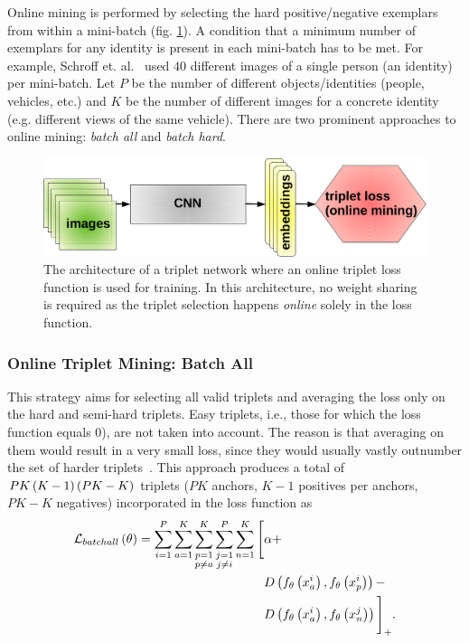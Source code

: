 Online mining is performed by selecting the hard positive/negative exemplars from within a mini-batch (fig. \ref{fig:TripletArchitectureOnlineMining}). A condition that a minimum number of exemplars for any identity is present in each mini-batch has to be met. For example, Schroff et. al.~\cite{schroff2015facenet} used $40$ different images of a single person (an identity) per mini-batch. Let $P$ be the number of different objects/identities (people, vehicles, etc.) and $K$ be the number of different images for a concrete identity (e.g. different views of the same vehicle). There are two prominent approaches to online mining: \emph{batch all} and \emph{batch hard}.

\begin{figure}[t]
    \centerline{\includegraphics[width=0.55\linewidth]{figures/theoretical_foundations/triplet_architecture_online_mining.pdf}}
    \caption[Triplet loss online mining architecture]{The architecture of a triplet network where an online triplet loss function is used for training. In this architecture, no weight sharing is required as the triplet selection happens \emph{online} solely in the loss function.}
    \label{fig:TripletArchitectureOnlineMining}
\end{figure}

\subsubsection{Online Triplet Mining: Batch All}

This strategy aims for selecting all valid triplets and averaging the loss only on the hard and semi-hard triplets. Easy triplets, i.e., those for which the loss function equals $0$), are not taken into account. The reason is that averaging on them would result in a very small loss, since they would usually vastly outnumber the set of harder triplets~\cite{hermans2017triplet}. This approach produces a total of $PK \left( {K - 1} \right) \left( {PK - K} \right)$ triplets ($PK$ anchors, $K - 1$ positives per anchors, $PK - K$ negatives) incorporated in the loss function as
\begin{equation}
    \label{eq:BatchAllLossFunction}
    \begin{aligned}
        {\mathcal{L}_{batchall}} \left( \theta \right) =
        \sum_{i = 1}^P
        \sum_{a = 1}^K
        \sum_{\substack{p = 1 \\p \neq a}}^K
        \sum_{\substack{j = 1 \\j \neq i}}^P
        \sum_{n = 1}^K
        \Bigg[
         & \alpha +           \\
         & {D} \left( 
            {f_\theta} \left( x_a^i \right),
            {f_\theta} \left( x_p^i \right)
         \right) -                   \\
         & {D} \left( 
            {f_\theta} \left( x_a^i \right),
            {f_\theta} \left( x_n^j \right)
         \right)
        {\Bigg]}_{+}.
    \end{aligned}
\end{equation}

